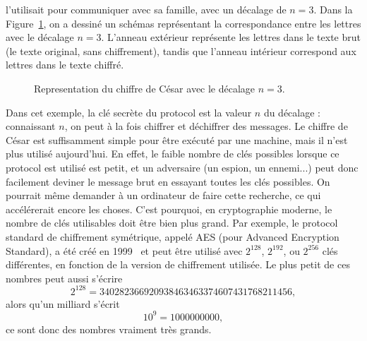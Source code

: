 l'utilisait pour communiquer avec sa famille, avec un décalage de $n=3$. Dans la
Figure~\ref{fig:caesar}, on a dessiné un schémas représentant la correspondance
entre les lettres avec le décalage $n=3$. L'anneau extérieur représente les
lettres dans le texte brut (le texte original, sans chiffrement), tandis que
l'anneau intérieur correspond aux lettres dans le texte chiffré.
\begin{figure}[h]
  \centering
  \caption{Representation du chiffre de César avec le décalage $n=3$.}
  \label{fig:caesar}
\end{figure}
Dans cet exemple, la clé secrète du protocol est la valeur $n$ du décalage :
connaissant $n$, on peut à la fois chiffrer et déchiffrer des messages. Le
chiffre de César est suffisamment simple pour être exécuté par une machine, mais
il n'est plus utilisé aujourd'hui. En effet, le faible nombre de clés possibles
lorsque ce protocol est utilisé est petit, et un adversaire (un espion, un
ennemi...) peut donc facilement deviner le message brut en essayant toutes les
clés possibles. On pourrait même demander à un ordinateur de faire cette
recherche, ce qui accélérerait encore les choses. C'est pourquoi, en
cryptographie moderne, le nombre de clés utilisables doit être bien plus grand.
Par exemple, le protocol standard de chiffrement symétrique, appelé AES (pour
Advanced Encryption Standard), a été créé en 1999~\cite{DR99, DR02} et peut être
utilisé avec $2^{128}$, $2^{192}$, ou $2^{256}$ clés différentes, en fonction de
la version de chiffrement utilisée. Le plus petit de ces nombres peut aussi
s'écrire
\[
  2^{128} = 340282366920938463463374607431768211456,
\]
alors qu'un milliard s'écrit
\[
  10^{9} = 1000000000,
\]
ce sont donc des nombres vraiment très grands.

